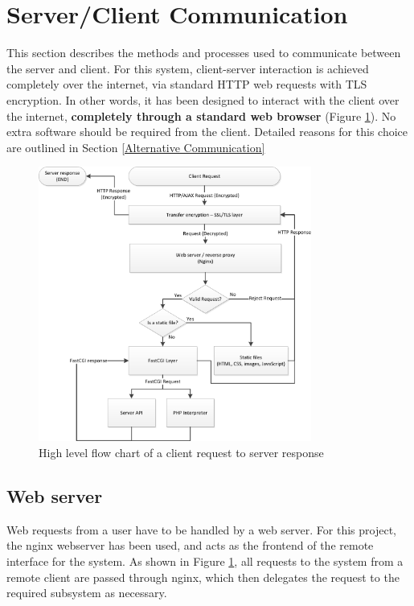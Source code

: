 

\section{Server/Client Communication}\label{Communications}


This section describes the methods and processes used to communicate between the server and client. For this system, client-server interaction is achieved completely over the internet, via standard HTTP web requests with TLS encryption. In other words, it has been designed to interact with the client over the internet, {\bf completely through a standard web browser} (Figure \ref{client_request_flowchart.png}). No extra software should be required from the client. Detailed reasons for this choice are outlined in Section \ref{Alternative Communication}

\begin{figure}[H]
	\centering
	\includegraphics[width=0.8\textwidth]{figures/client_request_flowchart.png}
	\caption{High level flow chart of a client request to server response} 
	\label{client_request_flowchart.png}
\end{figure}

\subsection{Web server}

Web requests from a user have to be handled by a web server. For this project, the nginx\cite{nginx} webserver has been used, and acts as the frontend of the remote interface for the system. As shown in Figure \ref{client_request_flowchart.png}, all requests to the system from a remote client are passed through nginx, which then delegates the request to the required subsystem as necessary. 


